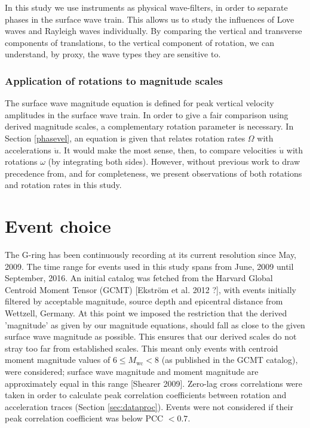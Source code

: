 \documentclass{gji}
\begin{document}
In this study we use instruments as physical wave-filters, in order to separate phases in the surface wave train. This allows us to study the influences of Love waves and Rayleigh waves individually. By comparing the vertical and transverse components of translations, to the vertical component of rotation, we can understand, by proxy, the wave types they are sensitive to.

\subsubsection{Application of rotations to magnitude scales}
The surface wave magnitude equation is defined for peak vertical velocity amplitudes in the surface wave train. In order to give a fair comparison using derived magnitude scales, a complementary rotation parameter is necessary. In Section \ref{phasevel}, an equation is given that relates rotation rates $\Omega$ with accelerations $\ddot{u}$. It would make the most sense, then, to compare velocities $\dot{u}$ with rotations $\omega$ (by integrating both sides). However, without previous work to draw precedence from, and for completeness, we present observations of both rotations and rotation rates in this study.

\section{Event choice}
The G-ring has been continuously recording at its current resolution since May, 2009. %
The time range for events used in this study spans from June, 2009 until September, 2016. An initial catalog was fetched from the Harvard Global Centroid Moment Tensor (GCMT) [Ekstr\"om et al. 2012 ?], %
with events initially filtered by acceptable magnitude, source depth and epicentral distance from Wettzell, Germany. At this point we imposed the restriction that the derived 'magnitude' as given by our magnitude equations, should fall as close to the given surface wave magnitude as possible. This ensures that our derived scales do not stray too far from established scales. This meant only events with centroid moment magnitude values of $6 \le M_{\text{wc}} < 8$ (as published in the GCMT catalog), were considered;   surface wave magnitude and moment magnitude are approximately equal in this range [Shearer 2009]. %
Zero-lag cross correlations were taken in order to calculate peak correlation coefficients between rotation and acceleration traces (Section \ref{sec:dataproc}). Events were not considered if their peak correlation coefficient was below PCC $< 0.7$. 
\end{document}
